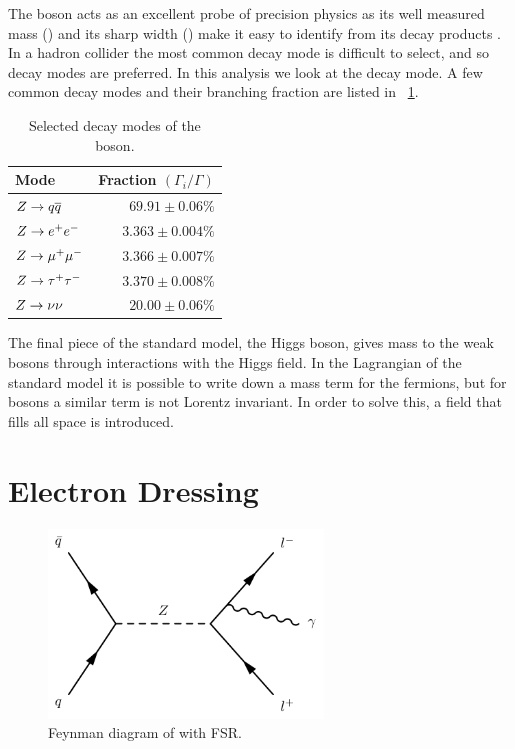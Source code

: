 The \Z boson acts as an excellent probe of precision physics as its well
measured mass (\Zmass) and its sharp width (\Zwidth) make it easy to identify
from its decay products \cite{pdg2014}. In a hadron collider the most common
\Ztoqq decay mode is difficult to select, and so \Ztoll decay modes are
preferred. In this analysis we look at the \Ztoee decay mode. A few common
decay modes and their branching fraction are listed in
\TAB~\ref{table:z_decays}.

\begin{table}[h]
\centering
{}
\begin{center}
    \begin{tabular}{@{}l  r@{}}
        \toprule
        Mode & Fraction $\left( \Gamma_{i} / \Gamma \right)$ \\
        \midrule
        $Z \to q \overline{q}$ & $69.91 \pm 0.06\%$ \\
        $Z \to e^{+} e^{-}$ & $3.363 \pm 0.004\%$ \\
        $Z \to \mu^{+} \mu^{-}$ & $3.366 \pm 0.007\%$ \\
        $Z \to \tau^{+} \tau^{-}$ & $3.370 \pm 0.008\%$ \\
        $Z \to \nu \nu$ & $20.00 \pm 0.06\%$ \\
        \bottomrule
    \end{tabular}
    \caption{
        Selected decay modes of the \Z boson.
    }
\label{table:z_decays}
\end{center}
\end{table}

The final piece of the standard model, the Higgs boson, gives mass to the weak
bosons through interactions with the Higgs field. In the Lagrangian of the
standard model it is possible to write down a mass term for the \spinhalf
fermions, but for \spinone bosons a similar term is not Lorentz invariant. In
order to solve this, a \spinzero field that fills all space is introduced.

\section{Electron Dressing}
\label{sec:electron_dressing}

\begin{figure}[!htbp]
    \centering
    \includegraphics[width=0.65\textwidth]{figures/fsr.pdf}
    \caption{
        Feynman diagram of \Ztoll with FSR.
    }
    \label{fig:fsr_diagram}
\end{figure}

